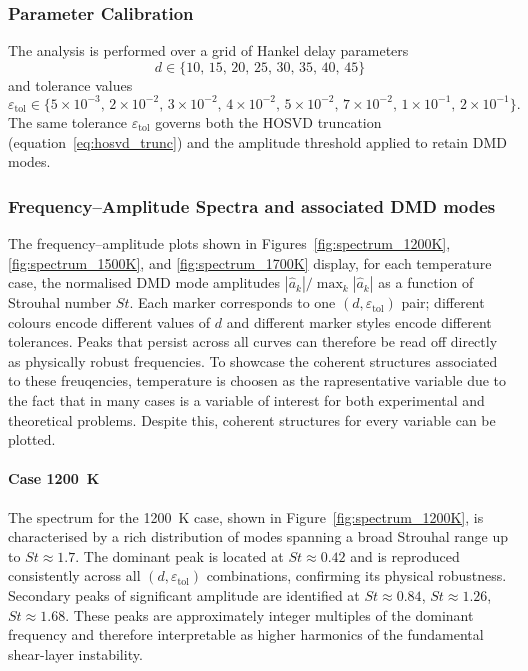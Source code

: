 \subsubsection{Parameter Calibration}
\label{sec:coria_params}

The analysis is performed over a grid of Hankel delay parameters
\begin{equation}
    d \in \{10,\, 15,\, 20,\, 25,\, 30,\, 35,\, 40,\, 45\}
    \label{eq:d_values}
\end{equation}
and tolerance values
\begin{equation}
    \varepsilon_{\mathrm{tol}} \in
    \{5\times10^{-3},\, 2\times10^{-2},\, 3\times10^{-2},\, 4\times10^{-2},\,
      5\times10^{-2},\, 7\times10^{-2},\, 1\times10^{-1},\, 2\times10^{-1}\}.
    \label{eq:tol_values}
\end{equation}
The same tolerance $\varepsilon_{\mathrm{tol}}$ governs both the HOSVD truncation (equation~\eqref{eq:hosvd_trunc}) and the amplitude threshold applied to retain DMD modes.




\subsubsection{Frequency--Amplitude Spectra and associated DMD modes}
\label{sec:freq_amplitude}

The frequency--amplitude plots shown in Figures~\ref{fig:spectrum_1200K}, \ref{fig:spectrum_1500K}, and \ref{fig:spectrum_1700K} display, for each temperature case, the normalised DMD mode amplitudes $|\hat{a}_k| / \max_k |\hat{a}_k|$ as a function of Strouhal number $St$. Each marker corresponds to one $(d, \varepsilon_{\mathrm{tol}})$ pair; different colours encode different values of $d$ and different marker styles encode different tolerances. Peaks that persist across all curves can therefore be read off directly as physically robust frequencies. To showcase the coherent structures associated to these freuqencies, temperature is choosen as the rapresentative variable due to the fact that in many cases is a variable of interest for both experimental and theoretical problems. Despite this, coherent structures for every variable can be plotted.

\paragraph{Case 1200~K}
\label{sec:spectrum_1200K}

The spectrum for the 1200~K case, shown in Figure~\ref{fig:spectrum_1200K}, is characterised by a rich distribution of modes spanning a broad Strouhal range up to $St \approx 1.7$. The dominant peak is located at $St \approx 0.42$ and is reproduced consistently across all $(d, \varepsilon_{\mathrm{tol}})$ combinations, confirming its physical robustness. Secondary peaks of significant amplitude are identified at $St \approx 0.84$, $St \approx 1.26$, $St \approx 1.68$. These peaks are approximately integer multiples of the dominant frequency and therefore interpretable as higher harmonics of the fundamental shear-layer instability. 

